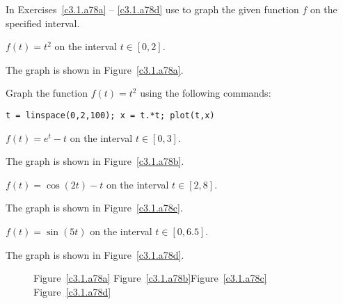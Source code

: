 \documentclass{ximera}
\begin{document}
\noindent In Exercises~\ref{c3.1.a78a} -- \ref{c3.1.a78d} use \Matlab
to graph the given function $f$ on the specified interval.
\begin{computerExercise} \label{c3.1.a78a}
$f(t) = t^2$ on the interval $t\in [0,2]$.

\begin{solution}

\ans The graph is shown in Figure~\ref{c3.1.a78a}.

\soln Graph the function $f(t) = t^2$ using the following \Matlab commands:
\begin{verbatim}
t = linspace(0,2,100); x = t.*t; plot(t,x)
\end{verbatim}

\end{solution}
\end{computerExercise}
\begin{computerExercise} \label{c3.1.a78b}
$f(t) = e^t-t$ on the interval $t\in [0,3]$.

\begin{solution}
The graph is shown in Figure~\ref{c3.1.a78b}.

\end{solution}
\end{computerExercise}
\begin{computerExercise} \label{c3.1.a78c}
$f(t) = \cos(2t)-t$ on the interval $t\in [2,8]$.

\begin{solution}
The graph is shown in Figure~\ref{c3.1.a78c}.

\end{solution}
\end{computerExercise}
\begin{computerExercise} \label{c3.1.a78d}
$f(t) = \sin(5t)$ on the interval $t\in [0,6.5]$.

\begin{solution}
The graph is shown in Figure~\ref{c3.1.a78d}.

\begin{figure}[htb]
                       \centerline{%
                       }
	\centerline{Figure~\ref{c3.1.a78a}\hspace{0.8in}
	Figure~\ref{c3.1.a78b}\hspace{0.8in}Figure~\ref{c3.1.a78c}
	\hspace{0.8in}Figure~\ref{c3.1.a78d}}
\end{figure}

\end{solution}
\end{computerExercise}
\end{document}
